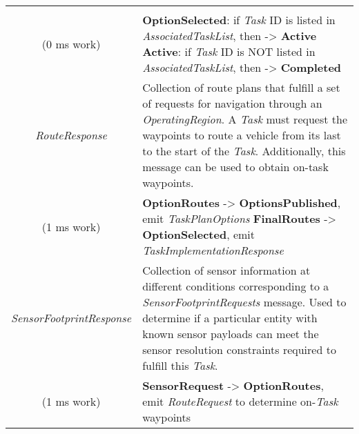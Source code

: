 \begin{longtable}[]{@{}cl@{}}
\begin{minipage}[t]{0.55\columnwidth}
\end{minipage}\tabularnewline
\begin{minipage}[t]{0.40\columnwidth}\centering\strut
(0 ms work)\strut
\end{minipage} & \begin{minipage}[t]{0.55\columnwidth}\raggedright\strut
\textbf{OptionSelected}: if \emph{Task} ID is listed in
\emph{AssociatedTaskList}, then -\textgreater{} \textbf{Active}
\textbf{Active}: if \emph{Task} ID is NOT listed in
\emph{AssociatedTaskList}, then -\textgreater{} \textbf{Completed}\strut
\end{minipage}\tabularnewline
\begin{minipage}[t]{0.40\columnwidth}\centering\strut
\emph{RouteResponse}\strut
\end{minipage} & \begin{minipage}[t]{0.55\columnwidth}\raggedright\strut
Collection of route plans that fulfill a set of requests for navigation
through an \emph{OperatingRegion}. A \emph{Task} must request the
waypoints to route a vehicle from its last to the start of the
\emph{Task}. Additionally, this message can be used to obtain on-task
waypoints.\strut
\end{minipage}\tabularnewline
\begin{minipage}[t]{0.40\columnwidth}\centering\strut
(1 ms work)\strut
\end{minipage} & \begin{minipage}[t]{0.55\columnwidth}\raggedright\strut
\textbf{OptionRoutes} -\textgreater{} \textbf{OptionsPublished}, emit
\emph{TaskPlanOptions} \textbf{FinalRoutes} -\textgreater{}
\textbf{OptionSelected}, emit \emph{TaskImplementationResponse}\strut
\end{minipage}\tabularnewline
\begin{minipage}[t]{0.40\columnwidth}\centering\strut
\emph{SensorFootprintResponse}\strut
\end{minipage} & \begin{minipage}[t]{0.55\columnwidth}\raggedright\strut
Collection of sensor information at different conditions corresponding
to a \emph{SensorFootprintRequests} message. Used to determine if a
particular entity with known sensor payloads can meet the sensor
resolution constraints required to fulfill this \emph{Task}.\strut
\end{minipage}\tabularnewline
\begin{minipage}[t]{0.40\columnwidth}\centering\strut
(1 ms work)\strut
\end{minipage} & \begin{minipage}[t]{0.55\columnwidth}\raggedright\strut
\textbf{SensorRequest} -\textgreater{} \textbf{OptionRoutes}, emit
\emph{RouteRequest} to determine on-\emph{Task} waypoints\strut
\end{minipage}\tabularnewline
\bottomrule
\end{longtable}

